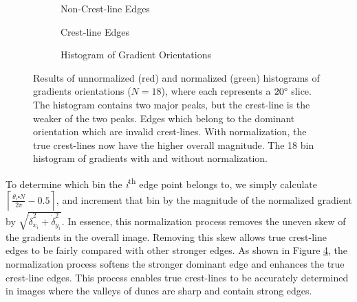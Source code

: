   \begin{figure}
  	\centering
  	\begin{subfigure}{0.48\textwidth}
  		\centering
  		\caption{Non-Crest-line Edges}
  		\label{fig:false_dominant_orientation_image}
  	\end{subfigure}
  	\begin{subfigure}{0.48\textwidth}
  		\centering
  		\caption{Crest-line Edges}
  		\label{fig:true_dominant_orientation_image}
  	\end{subfigure}
  	\begin{subfigure}{\textwidth}
  		\centering
  		\caption{Histogram of Gradient Orientations}
  		\label{fig:dominant_orientation_histogram}
  	\end{subfigure}
  	\caption{Results of unnormalized (red) and normalized (green) histograms of gradients orientations ($N=18$), where each represents a $20\degree$ slice. The histogram contains two major peaks, but the crest-line is the weaker of the two peaks.  Edges which belong to the dominant orientation which are invalid crest-lines.  With normalization, the true crest-lines now have the higher overall magnitude.  The 18 bin histogram of gradients with and without normalization.}
  	\label{fig:computing_dominant_orientation}
  \end{figure}
  
To determine which bin the \emph{i}\textsuperscript{th} edge point belongs to, we simply calculate $\left\lceil \frac{\dot{\theta_{i}}\centerdot N}{2\pi}-0.5\right\rceil $,	and increment that bin by the magnitude of the normalized gradient	by $\sqrt{\dot{\delta}_{x_{i}}^{2}+\dot{\delta}_{y_{i}}^{2}}$. In essence, this normalization process removes the uneven skew of the gradients in the overall image. Removing this skew allows true crest-line edges to be fairly compared with other stronger edges. As shown in Figure \ref{fig:computing_dominant_orientation}, the normalization process softens the stronger dominant edge and enhances the true crest-line edges. This process enables true crest-lines to be accurately determined in images where the valleys of dunes are sharp and contain strong edges.
  
